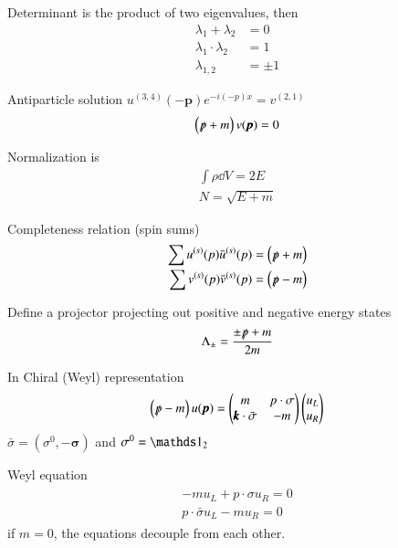 Determinant is the product of two eigenvalues, then
\begin{align*}
   \lambda_1 + \lambda_2 &= 0 \\
   \lambda_1 \cdot \lambda_2 &= 1 \\
   \lambda_{1,2} &= \pm 1
\end{align*}

Antiparticle solution $u^{(3,4)}(-\pmb{p}) e^{-i(-p)x} = v^{(2,1)}$
\begin{align}
   \left( \slashed{p} + m \right)v(\pmb{p}) = 0
\end{align}

Normalization is
\begin{align}
   \int \rho \dd{V} = 2E \\
   N = \sqrt{E+m}
\end{align}

Completeness relation (spin sums)
\begin{align}
   \sum u^{(s)}(p) \bar{u}^{(s)}(p ) = \left( \slashed{p} + m \right) \\
   \sum v^{(s)}(p) \bar{v}^{(s)}(p ) = \left( \slashed{p} - m \right)
\end{align}

Define a projector projecting out positive and negative energy states
\begin{align}
   \Lambda_{\pm} = \frac{\pm \slashed{p} + m}{2m}
\end{align}

In Chiral (Weyl) representation
\begin{align}
   \left( \slashed{p} - m \right) u(\pmb{p}) = \begin{pmatrix} m & p \cdot \sigma \\ \pmb{k} \cdot \bar{\sigma} & -m \end{pmatrix} \begin{pmatrix} u_L \\ u_R\end{pmatrix}
\end{align}
$\bar{\sigma} = (\sigma^0 , -\pmb{\sigma})$ and $\sigma^0 = \id_2$

Weyl equation
\begin{align}
   \begin{split}
    -m u_L + p\cdot \sigma u_R = 0 \\
   p \cdot \bar{\sigma} u_L - m u_R = 0
   \end{split}
\end{align}
if $m=0$, the equations decouple from each other.

